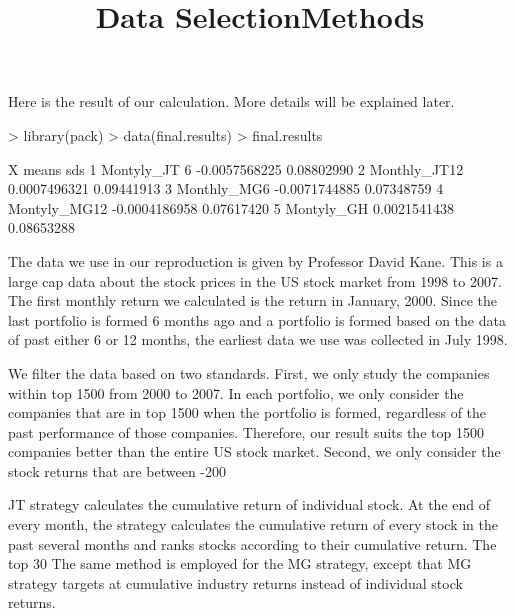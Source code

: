 \documentclass{article}
\begin{document}
Here is the result of our calculation. More details will be explained later.

\begin{center}

\begin{Schunk}
\begin{Sinput}
> library(pack)
> data(final.results)
> final.results
\end{Sinput}
\begin{Soutput}
             X         means        sds
1 Montyly_JT 6 -0.0057568225 0.08802990
2 Monthly_JT12  0.0007496321 0.09441913
3  Monthly_MG6 -0.0071744885 0.07348759
4 Montyly_MG12 -0.0004186958 0.07617420
5   Montyly_GH  0.0021541438 0.08653288
\end{Soutput}
\end{Schunk}

\end{center}

\title{\Large Data Selection}


The data we use in our reproduction is given by Professor David Kane. This is a large cap data about the stock prices in the US stock market from 1998 to 2007. The first monthly return we calculated is the return in January, 2000. Since the last portfolio is formed 6 months ago and a portfolio is formed based on the data of past either 6 or 12 months, the earliest data we use was collected in July 1998. 

We filter the data based on two standards. First, we only study the companies within top 1500 from 2000 to 2007. In each portfolio, we only consider the companies that are in top 1500 when the portfolio is formed, regardless of the past performance of those companies. Therefore, our result suits the top 1500 companies better than the entire US stock market. Second, we only consider the stock returns that are between -200%

\title {\Large Methods}


JT strategy calculates the cumulative return of individual stock. At the end of every month, the strategy calculates the cumulative return of every stock in the past several months and ranks stocks according to their cumulative return. The top 30%
The same method is employed for the MG strategy, except that MG strategy targets at cumulative industry returns instead of individual stock returns. 
\end{document}
